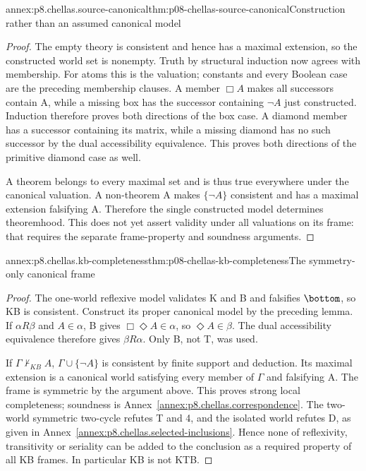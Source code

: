 \begin{annexitem}{annex:p8.chellas.source-canonical}{thm:p08-chellas-source-canonical}{Construction rather than an assumed canonical model}
\begin{proof}
The empty theory is consistent and hence has a maximal extension,
so the constructed world set is nonempty. Truth by structural induction
now agrees with membership. For atoms this is the valuation; constants
and every Boolean case are the preceding membership clauses. A member
\(\Box A\) makes all successors contain A, while a missing box has
the successor containing \(\neg A\) just constructed. Induction
therefore proves both directions of the box case. A diamond member has
a successor containing its matrix, while a missing diamond has no such
successor by the dual accessibility equivalence. This proves both
directions of the primitive diamond case as well.

A theorem belongs to every maximal set and is thus true everywhere
under the canonical valuation. A non-theorem A makes \(\{\neg A\}\)
consistent and has a maximal extension falsifying A. Therefore the
single constructed model determines theoremhood. This does not yet
assert validity under all valuations on its frame: that requires the
separate frame-property and soundness arguments.
\end{proof}
\end{annexitem}

\begin{annexitem}{annex:p8.chellas.kb-completeness}{thm:p08-chellas-kb-completeness}{The symmetry-only canonical frame}
\begin{proof}
The one-world reflexive model validates K and B and falsifies
\(\bottom\), so KB is consistent. Construct its proper canonical
model by the preceding lemma. If \(\alpha R\beta\) and
\(A\in\alpha\), B gives \(\Box\Diamond A\in\alpha\),
so \(\Diamond A\in\beta\). The dual accessibility equivalence
therefore gives \(\beta R\alpha\). Only B, not T, was used.

If \(\Gamma\not\vdash_{KB}A\),
\(\Gamma\cup\{\neg A\}\) is consistent by finite support and
deduction. Its maximal extension is a canonical world satisfying every
member of \(\Gamma\) and falsifying A. The frame is symmetric by
the argument above. This proves strong local completeness; soundness
is Annex~\ref{annex:p8.chellas.correspondence}.
The two-world symmetric two-cycle refutes T and 4, and the isolated
world refutes D, as given in
Annex~\ref{annex:p8.chellas.selected-inclusions}. Hence none of
reflexivity, transitivity or seriality can be added to the conclusion
as a required property of all KB frames. In particular KB is not KTB.
\end{proof}
\end{annexitem}

